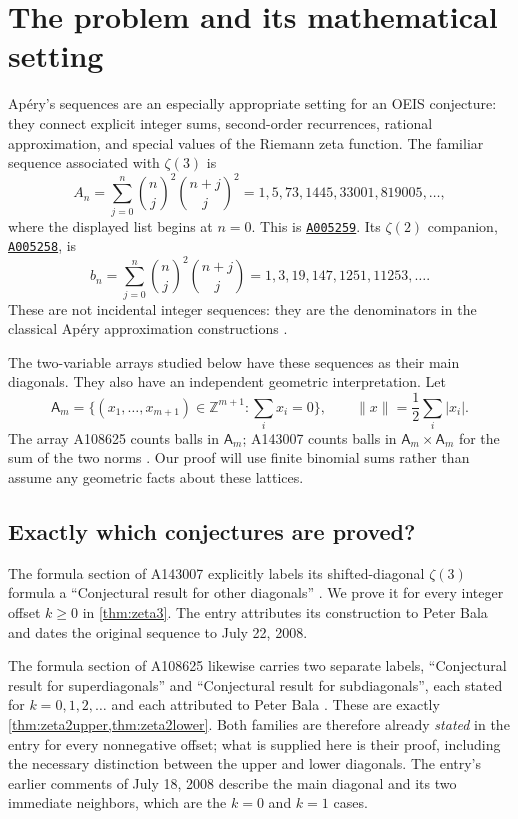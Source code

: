 \documentclass[11pt,letterpaper]{article}
\numberwithin{equation}{section}
\theoremstyle{definition}
\newcommand{\Z}{\mathbb Z}
\newcommand{\OEIS}[1]{\href{https://oeis.org/#1}{\texttt{#1}}}
\begin{document}
\tableofcontents
\newpage

\section{The problem and its mathematical setting}\label{sec:context}

Ap\'ery's sequences are an especially appropriate setting for an OEIS
conjecture: they connect explicit integer sums, second-order recurrences,
rational approximation, and special values of the Riemann zeta function.
The familiar sequence associated with $\zeta(3)$ is
\begin{equation}\label{eq:apery3def}
 A_n=\sum_{j=0}^{n}\binom nj^2\binom{n+j}{j}^2
 =1,5,73,1445,33001,819005,\ldots,
\end{equation}
where the displayed list begins at $n=0$. This is \OEIS{A005259}.
Its $\zeta(2)$ companion, \OEIS{A005258}, is
\begin{equation}\label{eq:apery2def}
 b_n=\sum_{j=0}^{n}\binom nj^2\binom{n+j}{j}
 =1,3,19,147,1251,11253,\ldots.
\end{equation}
These are not incidental integer sequences: they are the denominators
in the classical Ap\'ery approximation constructions
\cite{apery,oeis259,oeis258,cohen,straub}.

The two-variable arrays studied below have these sequences as their
main diagonals. They also have an independent geometric interpretation.
Let
\[
 \mathsf A_m=\{(x_1,\ldots,x_{m+1})\in\Z^{m+1}:\textstyle\sum_i x_i=0\},
 \qquad \|x\|=\frac12\sum_i|x_i|.
\]
The array A108625 counts balls in $\mathsf A_m$; A143007 counts balls
in $\mathsf A_m\times\mathsf A_m$ for the sum of the two norms
\cite{oeis108625,oeis143007,bacher}. Our proof will use finite binomial
sums rather than assume any geometric facts about these lattices.

\subsection{Exactly which conjectures are proved?}

The formula section of A143007 explicitly labels its shifted-diagonal
$\zeta(3)$ formula a ``Conjectural result for other diagonals''
\cite{oeis143007}. We prove it for every integer offset $k\geq0$ in
\cref{thm:zeta3}. The entry attributes its construction to Peter Bala
and dates the original sequence to July 22, 2008.

The formula section of A108625 likewise carries two separate labels,
``Conjectural result for superdiagonals'' and ``Conjectural result for
subdiagonals'', each stated for $k=0,1,2,\ldots$ and each attributed to
Peter Bala \cite{oeis108625}. These are exactly
\cref{thm:zeta2upper,thm:zeta2lower}. Both families are therefore already
\emph{stated} in the entry for every nonnegative offset; what is supplied
here is their proof, including the necessary distinction between the
upper and lower diagonals. The entry's earlier comments of July 18, 2008
describe the main diagonal and its two immediate neighbors, which are the
$k=0$ and $k=1$ cases.
\end{document}
